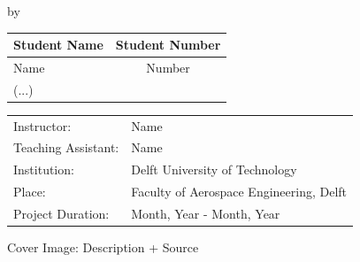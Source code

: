 \begin{titlepage}

\begin{center}

{\makeatletter
\largetitlestyle\fontsize{45}{45}\selectfont\@title
\makeatother}

{\makeatletter
\titlestyle\fontsize{20}{20}\selectfont\@subtitle
\makeatother}

\bigskip
\bigskip

by

\bigskip
\bigskip

{\makeatletter
\largetitlestyle\fontsize{25}{25}\selectfont\@author
\makeatother}

\bigskip
\bigskip

\setlength\extrarowheight{2pt}
\begin{tabular}{lc}
    Student Name & Student Number \\\hline
    Name & Number \\
    (...) \\
\end{tabular}

\vfill

\begin{tabular}{ll}
    Instructor: & Name \\
    Teaching Assistant: & Name \\
    Institution: & Delft University of Technology \\
    Place: & Faculty of Aerospace Engineering, Delft \\
    Project Duration: & Month, Year - Month, Year
\end{tabular}

\vspace{1cm}
\small{Cover Image: Description + Source}

\end{center}


\end{titlepage}
